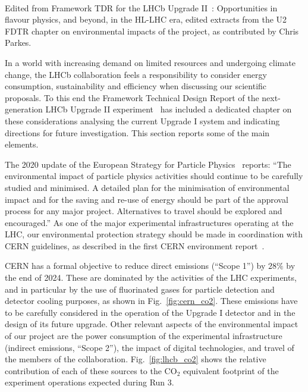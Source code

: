 \documentclass[../SustainableHEP.tex]{subfiles}
\begin{document}
\begin{casestudy}\\
{\footnotesize Edited from Framework TDR for the LHCb Upgrade II~\cite{LHCbU2FTDR}: Opportunities in flavour physics, and beyond, in the HL-LHC era, edited extracts from the U2 FDTR chapter on environmental impacts of the project, as contributed by Chris Parkes.}%

In a world with increasing demand on limited resources and undergoing climate change, the LHCb collaboration feels a responsibility to consider energy consumption, sustainability and efficiency when discussing our scientific proposals. To this end the Framework Technical Design Report of the next-generation LHCb Upgrade II experiment~\cite{LHCbU2FTDR} has included a dedicated chapter on these considerations analysing the current Upgrade I system and indicating directions for future investigation. This section reports some of the main elements.  

The 2020 update of the European Strategy for Particle Physics~\cite{EuropeanStrategy2020} reports: ``The environmental impact of particle physics activities should continue to be carefully studied and minimised. A detailed plan for the minimisation of environmental impact and for the saving and re-use of energy should be part of the approval process for any major project. Alternatives to travel should be explored and encouraged.'' 
As one of the major experimental infrastructures operating at the LHC,  our environmental protection strategy should be made in coordination with CERN guidelines, as described in the first CERN environment report~\cite{envrep2020}.

CERN has a formal objective to reduce direct emissions (``Scope 1'') by $28\%$ by the end of 2024. These are dominated by the activities of the LHC experiments, and in particular by the use of fluorinated gases for particle detection and detector cooling purposes, as shown in Fig.~\ref{fig:cern_co2}. These emissions have to be carefully considered in the operation of the Upgrade I detector and in the design of its future upgrade. Other relevant aspects of the environmental impact of our project are the power consumption of the experimental infrastructure (indirect emissions, ``Scope 2''), the impact of digital technologies, and travel of the members of the collaboration. Fig.~\ref{fig:lhcb_co2} shows the relative contribution of each of these sources to the CO$_2$ equivalent footprint of the experiment operations expected during Run 3. %


\end{casestudy}
\end{document}
